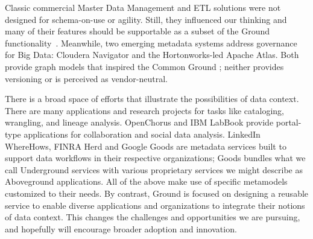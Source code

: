 \documentclass{sig-alternate}
\begin{document}
Classic commercial Master Data Management and ETL solutions were not designed for 
schema-on-use or agility. 
Still, they influenced our thinking and many of their features should be supportable as a subset of the Ground functionality~\cite{loshin2010master}.
Meanwhile,
two emerging metadata systems address governance for Big Data: Cloudera Navigator and the Hortonworks-led Apache Atlas. 
Both provide graph models that inspired the Common Ground \mantle; neither provides versioning or is perceived as vendor-neutral. %

There is a broad space of efforts that illustrate the possibilities of data context. 
There are many applications and research projects for tasks like cataloging, wrangling, and lineage analysis. 
OpenChorus and IBM LabBook provide portal-type applications for collaboration and social data analysis.
LinkedIn WhereHows, FINRA Herd and Google Goods are metadata services built to support data workflows in their respective organizations; Goods bundles what we call Underground services with various proprietary services we might describe as Aboveground applications.
All of the above make use of specific metamodels customized to their needs. By contrast, Ground is focused on designing a reusable service to enable diverse applications and organizations to integrate their notions 
of data context. 
This changes the challenges and opportunities we are pursuing, and hopefully will encourage broader adoption and innovation.


\end{document}
